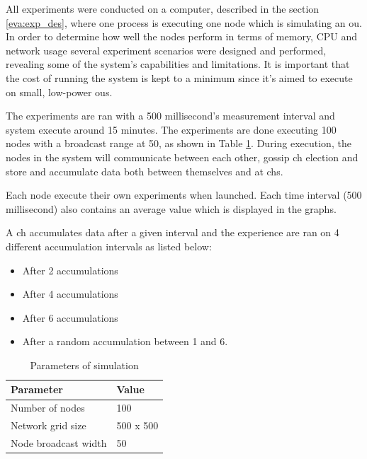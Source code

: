 \documentclass[USenglish]{uit-thesis}
\begin{document}
All experiments were conducted on a computer, described in the section \ref{eva:exp_des}, where one process is executing one node which is simulating an \gls{ou}. In order to determine how well the nodes perform in terms of memory, CPU and network usage several experiment scenarios were designed and performed, revealing some of the system's capabilities and limitations. It is important that the cost of running the system is kept to a minimum since it's aimed to execute on small, low-power \gls{ou}s.

The experiments are ran with a 500 millisecond's measurement interval and system execute around 15 minutes. The experiments are done executing 100 nodes with a broadcast range at 50, as shown in Table \ref{tab:simTable}. During execution, the nodes in the system will communicate between each other, gossip \gls{ch} election and store and accumulate data both between themselves and at \gls{ch}s.

Each node execute their own experiments when launched. Each time interval (500 millisecond) also contains an average value which is displayed in the graphs.

A \gls{ch} accumulates data after a given interval and the experience are ran on 4 different accumulation intervals as listed below:

\begin{itemize}
\item After 2 accumulations
\item After 4 accumulations
\item After 6 accumulations
\item After a random accumulation between 1 and 6.
\end{itemize}


\begin{table}
\centering
\begin{tabular}{|l|l|}
\hline
\textbf{Parameter}       & \textbf{Value} \\ \hline
Number of nodes          & 100            \\ \hline
Network grid size        & 500 x 500      \\ \hline
Node broadcast width     & 50             \\ \hline
\end{tabular}
\caption{Parameters of simulation}
\label{tab:simTable}
\end{table}
\end{document}
